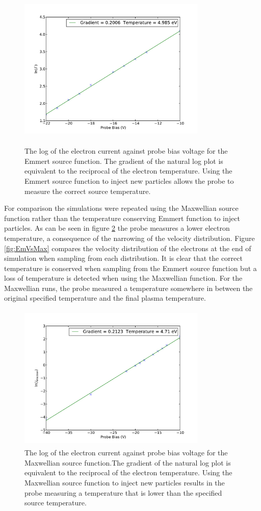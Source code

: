 \begin{figure}[H]
\centering
\includegraphics[height=7cm,width=0.8\textwidth]{ideal_theory_emmert.pdf}
\label{fig:ideal_temp}
\caption{The log of the electron current against probe bias voltage for the Emmert source function. The gradient of the natural log plot is equivalent to the reciprocal of the electron temperature. Using the Emmert source function to inject new particles allows the probe to measure the correct source temperature.}
\end{figure}
For comparison the simulations were repeated using the Maxwellian source function rather than the temperature conserving Emmert function to inject particles. As can be seen in figure \ref{fig:e_grad_max}   the probe measures a lower electron temperature, a consequence of the narrowing of the velocity distribution. Figure \ref{fig:EmVsMax} compares the velocity distribution of the electrons at the end of simulation when sampling from each distribution. It is clear that the correct temperature is conserved when sampling from the Emmert source function but a loss of temperature is detected when using the Maxwellian function. For the Maxwellian runs, the probe measured a temperature somewhere in between the original specified temperature and the final plasma temperature.

\begin{figure}[H]
	\centering
	\includegraphics[height=7cm,width=0.8\textwidth]{ideal_theory_maxwell.pdf}
	\caption{The log of the electron current against probe bias voltage for the Maxwellian source function.The gradient of the natural log plot is equivalent to the reciprocal of the electron temperature. Using the Maxwellian source function to inject new particles results in the probe measuring a temperature that is lower than the specified source temperature.}
	\label{fig:e_grad_max}
\end{figure}

